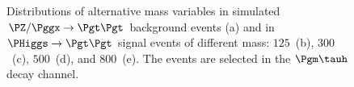 \begin{figure}
\begin{center}
\end{center}
\caption{
  Distributions of alternative mass variables in simulated $\PZ/\Pggx \to \Pgt\Pgt$ background events (a) 
  and in $\PHiggs \to \Pgt\Pgt$ signal events of different mass:
  $125$~\GeV (b), $300$~\GeV (c), $500$~\GeV (d), and $800$~\GeV (e).
  The events are selected in the $\Pgm\tauh$ decay channel.
}
\label{fig:massDistributions_mutau}
\end{figure}

